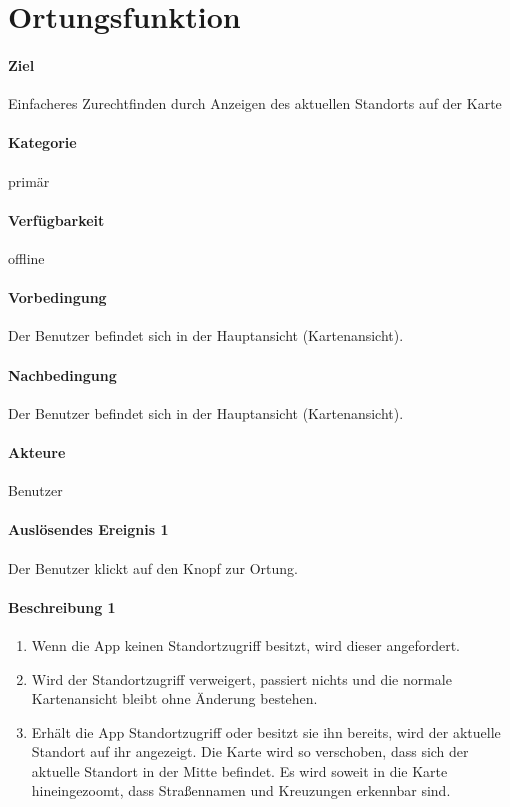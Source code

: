 \section{Ortungsfunktion}
\paragraph{Ziel}
Einfacheres Zurechtfinden durch Anzeigen des aktuellen Standorts auf der Karte
\paragraph{Kategorie}
primär
\paragraph{Verfügbarkeit}
offline
\paragraph{Vorbedingung}
Der Benutzer befindet sich in der Hauptansicht (Kartenansicht).
\paragraph{Nachbedingung}
Der Benutzer befindet sich in der Hauptansicht (Kartenansicht).
\paragraph{Akteure}
Benutzer
\paragraph{Auslösendes Ereignis 1}
Der Benutzer klickt auf den Knopf zur Ortung.
\paragraph{Beschreibung 1}
\begin{enumerate}
    \item Wenn die App keinen Standortzugriff besitzt, wird dieser angefordert.
    \item Wird der Standortzugriff verweigert, passiert nichts und die normale Kartenansicht bleibt ohne Änderung bestehen.
    \item Erhält die App Standortzugriff oder besitzt sie ihn bereits, wird der aktuelle Standort auf ihr angezeigt. Die Karte wird so verschoben, dass sich der aktuelle Standort in der Mitte befindet. Es wird soweit in die Karte hineingezoomt, dass Straßennamen und Kreuzungen erkennbar sind.
\end{enumerate}

